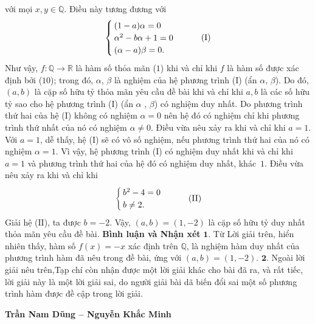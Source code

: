 \begin{multicols}{2}
\begin{align*}
	\end{align*}
	với mọi $x,y \in \mathbb{Q}$.
	\vskip 0.05cm
	Điều này tương đương với
	\begin{align*}
		\begin{cases}
			(1-a)\alpha = 0\\
			\alpha^2 - b\alpha + 1 = 0\\
			(\alpha - a)\beta = 0.
		\end{cases} \tag{$\text{I}$}
	\end{align*}
	Như vậy, $f: \mathbb{Q} \to \mathbb{R}$  là hàm số thỏa mãn ($1$) khi và chỉ khi $f$  là hàm số được xác định bởi ($10$); trong đó, $\alpha$, $\beta$  là nghiệm của hệ phương trình ($\text{I}$) (ẩn  $\alpha$, $\beta$).
	\vskip 0.05cm
	Do đó, $(a, b)$ là cặp số hữu tỷ thỏa mãn yêu cầu đề bài khi và chỉ khi $a, b$ là các số hữu tỷ sao cho hệ phương trình ($\text{I}$) (ẩn  $\alpha$ , $\beta$) có nghiệm duy nhất.
	\vskip 0.05cm
	Do phương trình thứ hai của hệ ($\text{I}$) không có nghiệm $\alpha = 0$  nên hệ đó có nghiệm chỉ khi phương trình thứ nhất của nó có nghiệm  $\alpha \ne 0$. Điều vừa nêu xảy ra khi và chỉ khi $a = 1$.
	\vskip 0.05cm
	Với $a = 1$, dễ thấy, hệ ($\text{I}$) sẽ có vô số nghiệm, nếu phương trình thứ hai của nó có nghiệm $\alpha = 1$.
	\vskip 0.05cm 
	Vì vậy, hệ phương trình ($\text{I}$) có nghiệm duy nhất khi và chỉ khi $a = 1$ và phương trình thứ hai của hệ đó có nghiệm duy nhất, khác~$1$. Điều vừa nêu xảy ra khi và chỉ khi
	\begin{align*}
		\begin{cases}
			b^2 - 4 = 0\\
			b \ne 2.
		\end{cases}\tag{$\text{II}$}
	\end{align*}
	Giải hệ ($\text{II}$), ta được $b = -2$.
	\vskip 0.05cm
	Vậy, $(a,b) = (1, -2)$  là cặp số hữu tỷ duy nhất thỏa mãn yêu cầu đề bài.
	\vskip 0.05cm
	\textbf{\color{thachthuctoanhoc}Bình luận và Nhận xét}
	\vskip 0.05cm
	$\pmb{1.}$ Từ Lời giải trên, hiển nhiên thấy, hàm số $f(x) = -x$  xác định trên  $\mathbb{Q}$, là nghiệm hàm duy nhất của phương trình hàm đã nêu trong đề bài, ứng với  $(a,b) = (1,-2)$.
	\vskip 0.05cm
	$\pmb{2.}$ Ngoài lời giải nêu trên,Tạp chí còn nhận được một lời giải khác cho bài đã ra, và rất tiếc, lời giải này là một lời giải sai, do người giải bài dã biến đổi sai một số phương trình hàm được đề cập trong lời giải.
	\begin{flushright}
		\textbf{\color{thachthuctoanhoc}Trần Nam Dũng -- Nguyễn Khắc Minh}
	\end{flushright}

\end{multicols}
